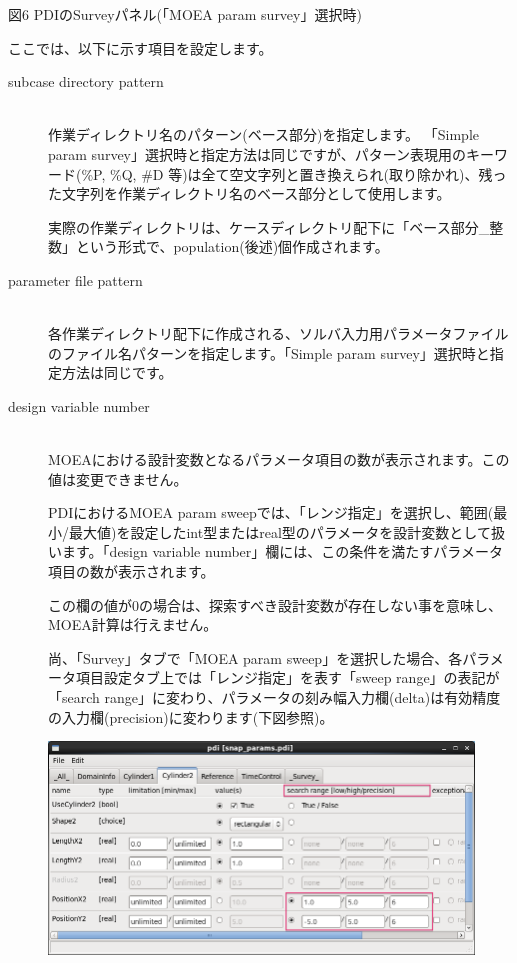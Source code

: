 \documentclass[a4paper,11pt]{jarticle}
\begin{document}
{\begin{center}
図6 PDIのSurveyパネル(「MOEA param survey」選択時)
\end{center}

ここでは、以下に示す項目を設定します。

\begin{description}
\item[subcase directory pattern] {\ }\\
作業ディレクトリ名のパターン(ベース部分)を指定します。
「Simple param survey」選択時と指定方法は同じですが、パターン表現用のキーワード(\%P, \%Q, \#D 等)は全て空文字列と置き換えられ(取り除かれ)、残った文字列を作業ディレクトリ名のベース部分として使用します。

実際の作業ディレクトリは、ケースディレクトリ配下に「ベース部分\_整数」という形式で、population(後述)個作成されます。\\

\item[parameter file pattern] {\ }\\
各作業ディレクトリ配下に作成される、ソルバ入力用パラメータファイルのファイル名パターンを指定します。「Simple param survey」選択時と指定方法は同じです。\\

\item[design variable number] {\ }\\
MOEAにおける設計変数となるパラメータ項目の数が表示されます。この値は変更できません。

PDIにおけるMOEA param sweepでは、「レンジ指定」を選択し、範囲(最小/最大値)を設定したint型またはreal型のパラメータを設計変数として扱います。「design variable number」欄には、この条件を満たすパラメータ項目の数が表示されます。

この欄の値が0の場合は、探索すべき設計変数が存在しない事を意味し、MOEA計算は行えません。

尚、「Survey」タブで「MOEA param sweep」を選択した場合、各パラメータ項目設定タブ上では「レンジ指定」を表す「sweep range」の表記が「search range」に変わり、パラメータの刻み幅入力欄(delta)は有効精度の入力欄(precision)に変わります(下図参照)。

\begin{center}
\includegraphics[width=320pt, bb=0 0 856 429]{figs/fig006.png}


\end{center}
\end{description}}
\end{document}
